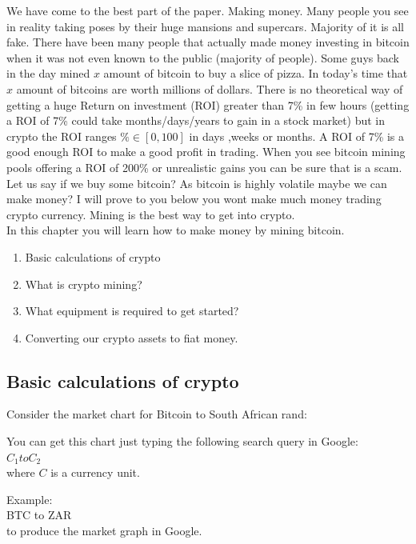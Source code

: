 We have come to the best part of the paper. Making money. Many people you see in reality taking poses by their huge mansions and supercars. Majority of it is all fake. There have been many people that actually made money investing in bitcoin when it was not even known to the public (majority of people). Some guys back in the day mined $x$ amount of bitcoin to buy a slice of pizza. In today's time that $x$ amount of bitcoins are worth millions of dollars.
There is no theoretical way of getting a huge Return on investment (ROI) greater than 7\% in few hours (getting a ROI of 7\% could take months/days/years to gain in a stock market) but in crypto the ROI ranges $\% \in [0,100]$ in days ,weeks or months. A ROI of 7\% is a good enough ROI to make a good profit in trading. When you see bitcoin mining pools offering a ROI of 200\% or unrealistic gains you can be sure that is a scam. Let us say if we buy some bitcoin? As bitcoin is highly volatile maybe we can make money? I will prove to you below you wont make much money trading crypto currency. Mining is the best way to get into crypto. \\ 

In this chapter you will learn how to make money by mining bitcoin.
\begin{enumerate}
\item Basic calculations of crypto    
\item What is crypto mining?
\item What equipment is required to get started?
\item Converting our crypto assets to fiat money.
\end{enumerate}

\subsection{Basic calculations of crypto}

Consider the market chart for Bitcoin to South African rand:

You can get this chart just typing the following search query in Google: \\

$C_1 to C_2$ \\ 

where $C$ is a currency unit.

Example: \\

BTC to ZAR \\

to produce the market graph in Google.

